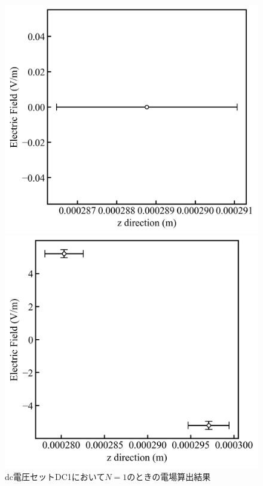 \begin{figure}[h]
	\begin{minipage}{0.33\linewidth}
		\begin{center}
			\includegraphics[width = 0.9\columnwidth]{./results/figure/DC1_N1.jpg}
			\caption{dc電圧セットDC1において$N=1$のときの電場算出結果}
			\label{fig:DC1_N1}
		\end{center}
	\end{minipage}
	\begin{minipage}{0.33\linewidth}
		\begin{center}
			\includegraphics[width = 0.9\columnwidth]{./results/figure/DC1_N2.jpg}

\end{center}
\end{minipage}
\end{figure}
